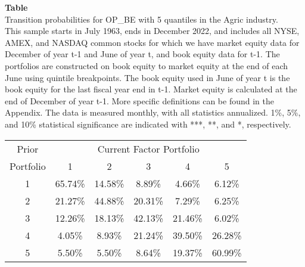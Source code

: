 \begin{table*}[ht!]
\raggedright
{}
\label{tab: transition_probs_OP_BE_Agric_with_5_quantiles}
\textbf{Table \thetable} \\
Transition probabilities for OP_BE with 5 quantiles in the Agric industry. \\
\hspace*{1em}This sample starts in July 1963, ends in December 2022, and includes all NYSE, AMEX, and NASDAQ common stocks for which we have market equity data for December of year t-1 and June of year t, and book equity data for t-1. The portfolios are constructed on book equity to market equity at the end of each June using quintile breakpoints.  The book equity used in June of year t is the book equity for the last fiscal year end in t-1.  Market equity is calculated at the end of December of year t-1.  More specific definitions can be found in the Appendix.  The data is measured monthly, with all statistics annualized.  1\%, 5\%, and 10\% statistical significance are indicated with ***, **, and *, respectively. \\
\vspace{0.5em}
\centering
\begin{adjustbox}{max width=\textwidth}
\begin{tabular}{@{}cccccc@{}}
\toprule
Prior & \multicolumn{5}{c}{Current Factor Portfolio} \\
Portfolio & 1 & 2 & 3 & 4 & 5 \\
\midrule
1 & 65.74\% & 14.58\% & 8.89\% & 4.66\% & 6.12\% \\
2 & 21.27\% & 44.88\% & 20.31\% & 7.29\% & 6.25\% \\
3 & 12.26\% & 18.13\% & 42.13\% & 21.46\% & 6.02\% \\
4 & 4.05\% & 8.93\% & 21.24\% & 39.50\% & 26.28\% \\
5 & 5.50\% & 5.50\% & 8.64\% & 19.37\% & 60.99\% \\
\bottomrule
\end{tabular}
\end{adjustbox}
\end{table*}